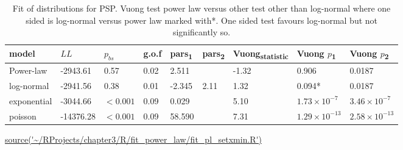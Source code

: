


\begin{table}[ht]
\centering
\setlength{\extrarowheight}{2pt}
\begin{adjustbox}{width=\textwidth}

\begin{tabular}{lllllllll}
  \toprule
model & $LL$ & $p_{bs}$ & g.o.f & pars\textsubscript{1} & pars\textsubscript{2} & Vuong\textsubscript{statistic} & Vuong $p$\textsubscript{1} & Vuong $p$\textsubscript{2} \\ 
  \midrule
Power-law & -2943.61 & 0.57 & 0.02 & 2.511 &  & -1.32 & 0.906 & 0.0187 \\ 
  log-normal & -2941.56 & 0.38 & 0.01 & -2.345 & 2.11 & 1.32 & 0.094* & 0.0187 \\ 
  exponential & -3044.66 & $<0.001$ & 0.09 & 0.029 &  & 5.10 & $1.73 \times 10^{-7}$ & $3.46 \times 10^{-7}$ \\ 
  poisson & -14376.28 & $<0.001$ & 0.09 & 58.590 &  & 7.31 & $1.29 \times 10^{-13}$ & $2.58 \times 10^{-13}$ \\ 
   \bottomrule
\end{tabular}
\end{adjustbox}
\caption{Fit of distributions for PSP. Vuong test power law versus other test other than log-normal where one sided is log-normal versus power law marked with*. One sided test favours log-normal but not significantly so.} 
\tiny\url{source('~/RProjects/chapter3/R/fit_power_law/fit_pl_setxmin.R')}
\label{tab:Fit of distributions for PSP}
\end{table}


















